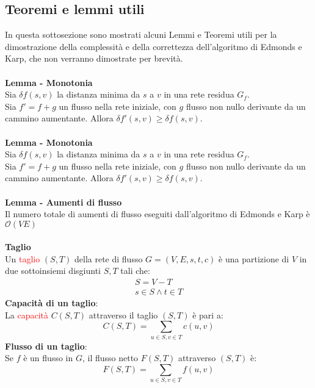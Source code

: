\documentclass[../cheatSheetAlgoritmi.tex]{subfiles}
\begin{document}
\subsection{Teoremi e lemmi utili}
In questa sottosezione sono mostrati alcuni Lemmi e Teoremi utili per la dimostrazione della complessità e della correttezza dell'algoritmo di Edmonds e Karp, che non verranno dimostrate per brevità.\\\\
\textbf{Lemma - Monotonia} \\
Sia $\delta f(s,v)$ la distanza minima da $s$ a $v$ in una rete residua $G_f$. \\Sia $f'=f+g$ un flusso nella rete iniziale, con $g$ flusso non nullo derivante da un cammino aumentante. Allora $\delta f'(s,v)\geq \delta f(s,v)$. \\\\
\textbf{Lemma - Monotonia} \\
Sia $\delta f(s,v)$ la distanza minima da $s$ a $v$ in una rete residua $G_f$. \\Sia $f'=f+g$ un flusso nella rete iniziale, con $g$ flusso non nullo derivante da un cammino aumentante. Allora $\delta f'(s,v)\geq \delta f(s,v)$. \\\\
\textbf{Lemma - Aumenti di flusso} \\
Il numero totale di aumenti di flusso eseguiti dall’algoritmo di Edmonds e Karp è $\mathcal{O}(V E)$ \\\\
\textbf{Taglio} \\
Un \textcolor{red}{taglio} $(S,T)$ della rete di flusso $G= (V, E, s, t, c)$ è una partizione di $V$ in due sottoinsiemi disgiunti $S, T$ tali che: 
\begin{align*}
  	S = V - T \\
  	s \in S \land t \in T
\end{align*}
\textbf{Capacità di un taglio}: \\
La \textcolor{red}{capacità} $C(S, T)$ attraverso il taglio $(S,T)$ è pari a:
\begin{equation*}
  	C(S, T) = \sum_{u \in S, v \in T} c(u, v)
\end{equation*}
\textbf{Flusso di un taglio}: \\
Se $f$ è un flusso in $G$, il flusso netto $F(S,T)$ attraverso $(S,T)$ è: 
\begin{equation*}
  	F(S,T) = \sum_{u \in S, v \in T}f(u,v)
\end{equation*}
\end{document}
